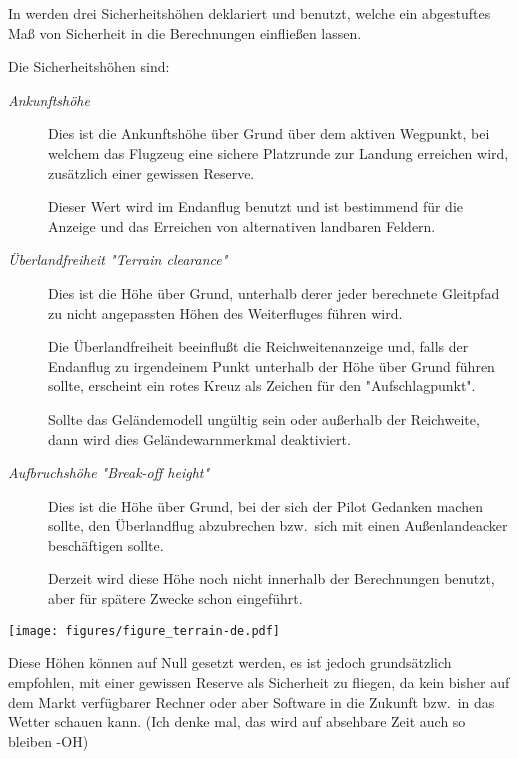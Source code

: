 In \xc werden drei Sicherheitshöhen deklariert und benutzt, welche ein abgestuftes Maß von Sicherheit in die Berechnungen einfließen lassen.

Die Sicherheitshöhen sind:
\begin{description}
\item[\textit{Ankunftshöhe}]
Dies ist die Ankunftshöhe über Grund über dem aktiven Wegpunkt, bei welchem das Flugzeug  eine sichere Platzrunde
zur Landung erreichen wird, zusätzlich einer gewissen Reserve.

Dieser Wert wird im Endanflug benutzt und ist bestimmend für die Anzeige und das Erreichen von alternativen landbaren Feldern.


\item[\textit{Überlandfreiheit "Terrain  clearance"}]
Dies ist die Höhe über Grund, unterhalb derer jeder berechnete Gleitpfad zu nicht
angepassten Höhen des Weiterfluges führen wird.

Die Überlandfreiheit beeinflußt die Reichweitenanzeige  und, falls der Endanflug zu irgendeinem
Punkt unterhalb der Höhe über Grund führen sollte, erscheint ein rotes Kreuz als Zeichen für den "Aufschlagpunkt".

Sollte das Geländemodell ungültig sein oder außerhalb der Reichweite, dann wird dies Geländewarnmerkmal deaktiviert.

\item[\textit{Aufbruchshöhe "Break-off height"}]
Dies ist die Höhe über Grund, bei der sich der Pilot Gedanken machen sollte, den Überlandflug abzubrechen
bzw.\ sich mit einen Außenlandeacker beschäftigen sollte.

Derzeit wird diese Höhe noch nicht innerhalb der Berechnungen benutzt, aber für spätere Zwecke schon eingeführt.
\end{description}

\begin{maxipage}
\begin{center}
\texttt{[image: figures/figure\_terrain-de.pdf]}
\end{center}
\end{maxipage}

\warning
Diese Höhen können auf  Null gesetzt werden, es ist jedoch grundsätzlich empfohlen, mit einer gewissen Reserve als Sicherheit
zu fliegen, da kein bisher auf dem Markt verfügbarer Rechner oder aber Software in die Zukunft bzw.\  in das Wetter schauen kann.
(Ich denke mal, das wird auf absehbare Zeit auch so bleiben -\textsf{OH})

